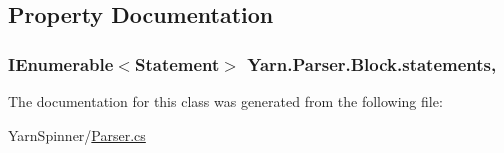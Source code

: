 \subsection{Property Documentation}
\hypertarget{a00022_a42e3d555bbd5ecbdf61c45ad715be7e1}{
\subsubsection[{statements}]{\setlength{\rightskip}{0pt plus 5cm}I\-Enumerable$<${\bf Statement}$>$ Yarn.\-Parser.\-Block.\-statements\hspace{0.3cm}{\ttfamily [get]}, {\ttfamily [package]}}}\label{a00022_a42e3d555bbd5ecbdf61c45ad715be7e1}


The documentation for this class was generated from the following file\-:\begin{DoxyCompactItemize}
\item 
Yarn\-Spinner/\hyperlink{a00266}{Parser.\-cs}\end{DoxyCompactItemize}
